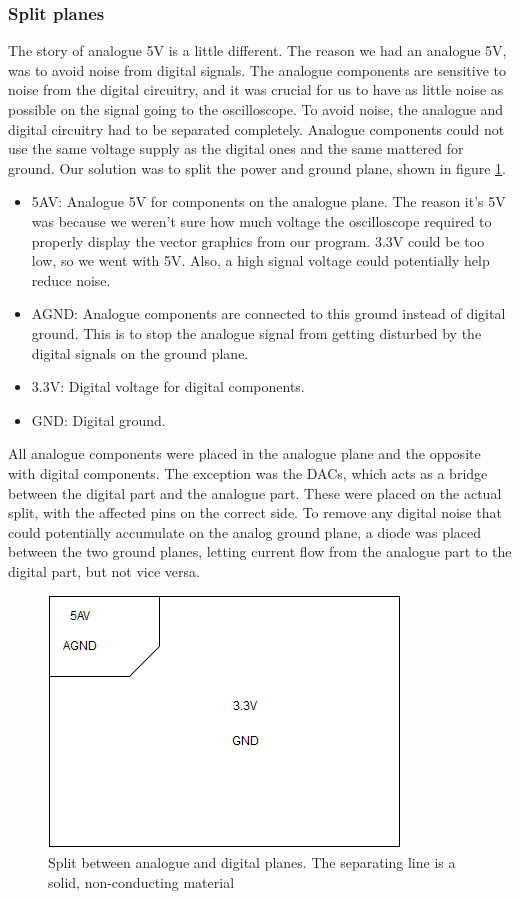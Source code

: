 \subsubsection{Split planes}
The story of analogue 5V is a little different. The reason we had an analogue 5V, was to avoid noise from digital signals. The analogue components are sensitive to noise from the digital circuitry, and it was crucial for us to have as little noise as possible on the signal going to the oscilloscope. 
To avoid noise, the analogue and digital circuitry had to be separated completely. Analogue components could not use the same voltage supply as the digital ones and the same mattered for ground.
\newline
\newline
Our solution was to split the power and ground plane, shown in figure \ref{fig:Split planes}. 
\begin{itemize}
\item 5AV: Analogue 5V for components on the analogue plane. The reason it's 5V was because we weren't sure how much voltage the oscilloscope required to properly display the vector graphics from our program. 3.3V could be too low, so we went with 5V. Also, a high signal voltage could potentially help reduce noise.
\item AGND: Analogue components are connected to this ground instead of digital ground. This is to stop the analogue signal from getting disturbed by the digital signals on the ground plane.
\item 3.3V: Digital voltage for digital components.
\item GND: Digital ground.
\end{itemize}
All analogue components were placed in the analogue plane and the opposite with digital components. The exception was the DACs, which acts as a bridge between the digital part and the analogue part. These were placed on the actual split, with the affected pins on the correct side.
\newline
To remove any digital noise that could potentially accumulate on the analog ground plane, a diode was placed between the two ground planes, letting current flow from the analogue part to the digital part, but not vice versa.

\begin{figure}[h!]
\centering
\includegraphics[scale = 0.6]{images/Split_planes.png}
\caption{Split between analogue and digital planes. The separating line is a solid, non-conducting material}
\label{fig:Split planes}
\end{figure}

